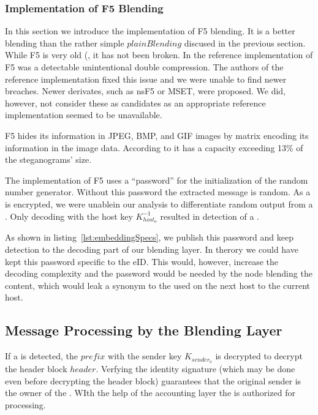 \subsubsection{Implementation of F5 Blending}
In this section we introduce the implementation of F5 blending. It is a better blending than the rather simple $plainBlending$ discused in the previous section. While F5 is very old (\citeyear{f5}, it has not been broken. In the reference implementation of F5 was a detectable unintentional double compression\cite{steganalysisf5}. The authors of the reference implementation fixed this issue \cite{F5broken} and we were unable to find newer breaches. Newer derivates, such as nsF5\cite{fridrich2007statistically} or MSET\cite{hosseini2015modification}, were proposed. We did, however, not consider these as candidates as an appropriate reference implementation seemed to be unavailable.

F5 hides its information in JPEG, BMP, and GIF images by matrix encoding its information in the image data. According to \cite{f5} it has a capacity exceeding 13\% of the steganograms' size.

The implementation of F5 uses a ``password'' for the initialization of the random number generator. Without this password the extracted message is random. As a \VortexMessage is encrypted, we were unablein our analysis to differentiate random output from a \VortexMessage. Only decoding with the host key $K^{-1}_{host_o}$ resulted in detection of a \VortexMessage.

As shown in listing~\ref{lst:embeddingSpecs}, we publish this password and keep detection to the decoding part of our blending layer. In therory we could have kept this password specific to the eID. This would, however, increase the decoding complexity and the password would be needed by the node blending the content, which would leak a synonym to the  used on the next host to the current host.

\subsection{Message Processing by the Blending Layer}
If a \VortexMessage is detected, the $prefix$ with the sender key $K_{sender_o}$ is decrypted to decrypt the header block $header$. Verfying the identity signature (which may be done even before decrypting the header block) guarantees that the original sender is the owner of the . WIth the help of the accounting layer the \VortexMessage{} is authorized for processing. 

